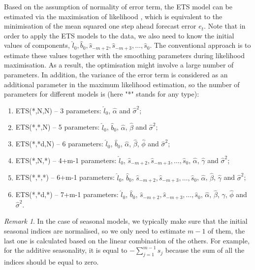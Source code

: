\documentclass[
]{book}
\providecommand{\tightlist}{%
  \setlength{\itemsep}{0pt}\setlength{\parskip}{0pt}}
\theoremstyle{definition}
\theoremstyle{definition}
\theoremstyle{definition}
\theoremstyle{definition}
\theoremstyle{remark}
\newtheorem*{remark}{Remark}
\begin{document}
Based on the assumption of normality of error term, the ETS model can be estimated via the maximisation of likelihood \citep[see Chapter 13 of][]{SvetunkovSBA}, which is equivalent to the minimisation of the mean squared one step ahead forecast error \(e_t\). Note that in order to apply the ETS models to the data, we also need to know the initial values of components, \(\hat{l}_0, \hat{b}_0, \hat{s}_{-m+2}, \hat{s}_{-m+3}, \dots, \hat{s}_{0}\). The conventional approach is to estimate these values together with the smoothing parameters during likelihood maximisation. As a result, the optimisation might involve a large number of parameters. In addition, the variance of the error term is considered as an additional parameter in the maximum likelihood estimation, so the number of parameters for different models is (here "*" stands for any type):

\begin{enumerate}
\def\labelenumi{\arabic{enumi}.}
\tightlist
\item
  ETS(*,N,N) -- 3 parameters: \(\hat{l}_0\), \(\hat{\alpha}\) and \(\hat{\sigma}^2\);
\item
  ETS(*,*,N) -- 5 parameters: \(\hat{l}_0\), \(\hat{b}_0\), \(\hat{\alpha}\), \(\hat{\beta}\) and \(\hat{\sigma}^2\);
\item
  ETS(*,*d,N) -- 6 parameters: \(\hat{l}_0\), \(\hat{b}_0\), \(\hat{\alpha}\), \(\hat{\beta}\), \(\hat{\phi}\) and \(\hat{\sigma}^2\);
\item
  ETS(*,N,*) -- 4+m-1 parameters: \(\hat{l}_0\), \(\hat{s}_{-m+2}, \hat{s}_{-m+3}, \dots, \hat{s}_{0}\), \(\hat{\alpha}\), \(\hat{\gamma}\) and \(\hat{\sigma}^2\);
\item
  ETS(*,*,*) -- 6+m-1 parameters: \(\hat{l}_0\), \(\hat{b}_0\), \(\hat{s}_{-m+2}, \hat{s}_{-m+3}, \dots, \hat{s}_{0}\), \(\hat{\alpha}\), \(\hat{\beta}\), \(\hat{\gamma}\) and \(\hat{\sigma}^2\);
\item
  ETS(*,*d,*) -- 7+m-1 parameters: \(\hat{l}_0\), \(\hat{b}_0\), \(\hat{s}_{-m+2}, \hat{s}_{-m+3}, \dots, \hat{s}_{0}\), \(\hat{\alpha}\), \(\hat{\beta}\), \(\hat{\gamma}\), \(\hat{\phi}\) and \(\hat{\sigma}^2\).
\end{enumerate}

\begin{remark}
In the case of seasonal models, we typically make sure that the initial seasonal indices are normalised, so we only need to estimate \(m-1\) of them, the last one is calculated based on the linear combination of the others. For example, for the additive seasonality, it is equal to \(-\sum_{j=1}^{m-1} s_j\) because the sum of all the indices should be equal to zero.
\end{remark}
\end{document}
